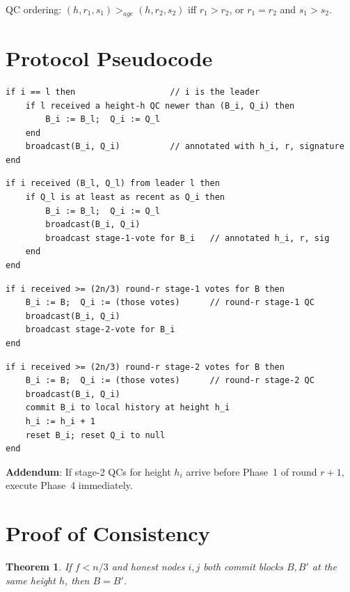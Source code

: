 \documentclass[12pt,a4paper,openany]{book}
\theoremstyle{definition}
\theoremstyle{plain}
\newtheorem{theorem}{Theorem}[chapter]
\theoremstyle{remark}
\begin{document}
QC ordering: $(h,r_1,s_1)>_{age}(h,r_2,s_2)$ iff $r_1>r_2$, or
$r_1=r_2$ and $s_1>s_2$.

\section{Protocol Pseudocode}

\begin{lstlisting}[language={},caption=Phase 1: Leader proposes]
if i == l then                   // i is the leader
    if l received a height-h QC newer than (B_i, Q_i) then
        B_i := B_l;  Q_i := Q_l
    end
    broadcast(B_i, Q_i)          // annotated with h_i, r, signature
end
\end{lstlisting}

\begin{lstlisting}[language={},caption=Phase 2: Stage-1 vote]
if i received (B_l, Q_l) from leader l then
    if Q_l is at least as recent as Q_i then
        B_i := B_l;  Q_i := Q_l
        broadcast(B_i, Q_i)
        broadcast stage-1-vote for B_i   // annotated h_i, r, sig
    end
end
\end{lstlisting}

\begin{lstlisting}[language={},caption=Phase 3: Stage-2 vote]
if i received >= (2n/3) round-r stage-1 votes for B then
    B_i := B;  Q_i := (those votes)      // round-r stage-1 QC
    broadcast(B_i, Q_i)
    broadcast stage-2-vote for B_i
end
\end{lstlisting}

\begin{lstlisting}[language={},caption=Phase 4: Commit]
if i received >= (2n/3) round-r stage-2 votes for B then
    B_i := B;  Q_i := (those votes)      // round-r stage-2 QC
    broadcast(B_i, Q_i)
    commit B_i to local history at height h_i
    h_i := h_i + 1
    reset B_i; reset Q_i to null
end
\end{lstlisting}

\textbf{Addendum}: If stage-2 QCs for height $h_i$ arrive before Phase~1
of round $r+1$, execute Phase~4 immediately.

\section{Proof of Consistency}

\begin{theorem}
  If $f < n/3$ and honest nodes $i,j$ both commit blocks $B,B'$ at the
  same height $h$, then $B=B'$.
\end{theorem}
\end{document}
